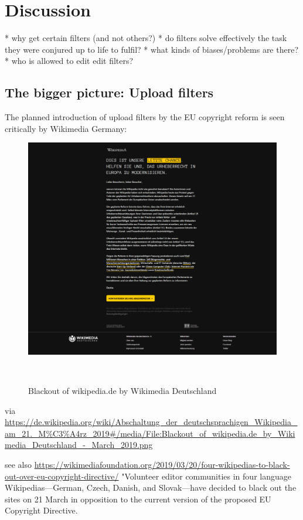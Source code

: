 \documentclass{sigchi}
\begin{document}
\section{Discussion}

* why get certain filters (and not others?)
* do filters solve effectively the task they were conjured up to life to fulfil?
* what kinds of biases/problems are there?
* who is allowed to edit edit filters?

\subsection{The bigger picture: Upload filters}

The planned introduction of upload filters by the EU copyright reform is seen critically by Wikimedia Germany:
\begin{figure}
\centering
  \includegraphics[width=0.9\columnwidth]{figures/Blackout_of_wikipedia.de_by_Wikimedia_Deutschland_-_March_2019.png}
  \caption{Blackout of wikipedia.de by Wikimedia Deutschland}~\label{fig:blackout-upload-filters}
\end{figure}

via
\url{https://de.wikipedia.org/wiki/Abschaltung_der_deutschsprachigen_Wikipedia_am_21._M%C3%A4rz_2019#/media/File:Blackout_of_wikipedia.de_by_Wikimedia_Deutschland_-_March_2019.png}

see also
\url{https://wikimediafoundation.org/2019/03/20/four-wikipedias-to-black-out-over-eu-copyright-directive/}
"Volunteer editor communities in four language Wikipedias—German, Czech, Danish, and Slovak—have decided to black out the sites on 21 March in opposition to the current version of the proposed EU Copyright Directive.
\end{document}
